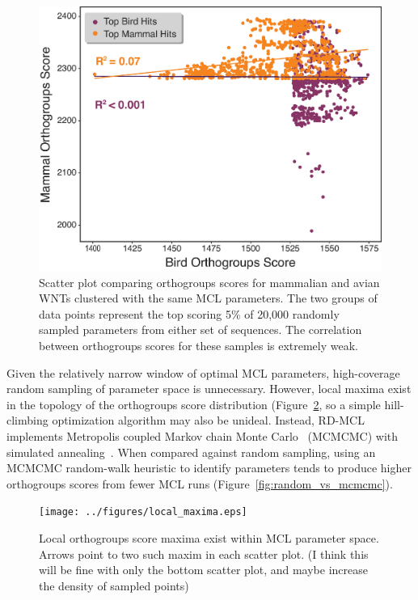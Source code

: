 \documentclass[twocolumn]{bmcart}  %
\begin{document}
\begin{figure}[t]
  \begin{center}
  \includegraphics[height=0.25\textheight]{../figures/mamm_bird_max_scores.eps}
\end{center}
\caption{Scatter plot comparing orthogroups scores for mammalian and avian WNTs clustered with the same MCL parameters.
The two groups of data points represent the top scoring 5\% of 20,000 randomly sampled parameters from either set of sequences.
The correlation between orthogroups scores for these samples is extremely weak.}
\label{fig:mamm_bird_max_scores}
\end{figure}

Given the relatively narrow window of optimal MCL parameters, high-coverage random sampling of parameter space is unnecessary.
However, local maxima exist in the topology of the orthogroups score distribution (Figure~\ref{fig:local_maxima}, so a simple hill-climbing optimization algorithm may also be unideal.
Instead, RD-MCL implements Metropolis coupled Markov chain Monte Carlo~\cite{Hastings:1970iw} (MCMCMC) with simulated annealing~\cite{Kirkpatrick:1983kv}.
When compared against random sampling, using an MCMCMC random-walk heuristic to identify parameters tends to produce higher orthogroups scores from fewer MCL runs (Figure~\ref{fig:random_vs_mcmcmc}).


\begin{figure}[t]
  \begin{center}
  \texttt{[image: ../figures/local\_maxima.eps]}
\end{center}
\caption{Local orthogroups score maxima exist within MCL parameter space.
Arrows point to two such maxim in each scatter plot. (I think this will be fine with only the bottom scatter plot, and maybe increase the density of sampled points)}
\label{fig:local_maxima}
\end{figure}
\end{document}
